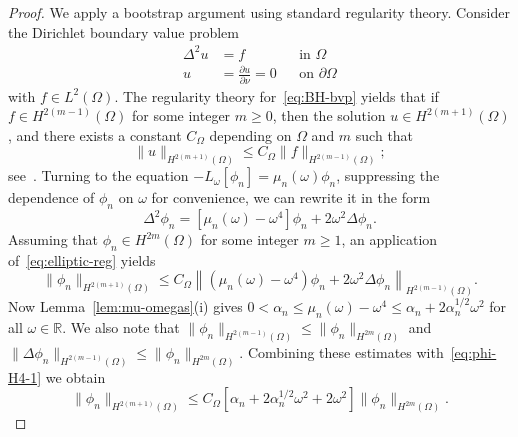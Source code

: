 \documentclass[a4paper, reqno,titlepage]{amsart}
\numberwithin{equation}{section}
\theoremstyle{plain}
\theoremstyle{definition}
\theoremstyle{remark}
\newcommand{\RR}{\mathbb{R}}
\begin{document}
\begin{proof}
  We apply a bootstrap argument using standard regularity theory. Consider the Dirichlet boundary value problem
  \begin{equation}
    \label{eq:BH-bvp}
    \begin{aligned}
      \Delta^2 u & = f                                   &  & \text{in } \Omega \\
      u          & = \frac{\partial u}{\partial \nu} = 0 &  & \text{on }
      \partial\Omega
    \end{aligned}
  \end{equation}
  with $f \in L^2(\Omega)$.  The regularity theory for~\eqref{eq:BH-bvp} yields that if $f \in H^{2(m-1)}(\Omega)$ for some integer $m \ge 0$, then the solution $u \in H^{2(m+1)}(\Omega)$, and there exists a constant $C_\Omega$ depending on $\Omega$ and $m$ such that
  \begin{equation}
    \label{eq:elliptic-reg}
    \|u\|_{H^{2(m+1)}(\Omega)} \leq C_\Omega \|f\|_{H^{2(m-1)}(\Omega)};
  \end{equation}
  see~\cite[Corollary 2.21]{GGS}. Turning to the equation $-L_\omega[\phi_n] = \mu_n(\omega) \phi_n$, suppressing the dependence of $\phi_n$ on $\omega$ for convenience, we can rewrite it in the form
  \begin{equation}
    \label{eq:BH-bvp-rearranged}
    \Delta^2 \phi_n
    = [\mu_n(\omega) - \omega^4] \phi_n + 2 \omega^2 \Delta \phi_n.
  \end{equation}
  Assuming that $\phi_n\in H^{2m}(\Omega)$ for some integer $m\geq 1$, an application of~\eqref{eq:elliptic-reg} yields
  \begin{equation}
    \label{eq:phi-H4-1}
    \| \phi_n \|_{H^{2(m+1)}(\Omega)}
    \leq C_\Omega \left\|(\mu_n(\omega) - \omega^4) \phi_n + 2 \omega^2 \Delta \phi_n \right\|_{H^{2(m-1)}(\Omega)}.
  \end{equation}
  Now Lemma~\ref{lem:mu-omegas}(i) gives $0<\alpha_n\leq \mu_n(\omega) - \omega^4 \leq \alpha_n +2 \alpha_n^{1/2} \omega^2$ for all $\omega \in \RR$. We also note that $\|\phi_n\|_{H^{2(m-1)}(\Omega)}\leq \| \phi_n \|_{H^{2m}(\Omega)}$ and $\|\Delta\phi_n\|_{H^{2(m-1)}(\Omega)}\leq \| \phi_n \|_{H^{2m}(\Omega)}$. Combining these estimates with~\eqref{eq:phi-H4-1} we obtain
  \begin{equation}
    \label{eq:phi-H4-2}
    \| \phi_n \|_{H^{2(m+1)}(\Omega)}
    \leq C_\Omega \left[ \alpha_n + 2\alpha_n^{1/2}\omega^2 + 2\omega^2\right]\| \phi_n \|_{H^{2m}(\Omega)}.
  \end{equation}

\end{proof}
\end{document}
